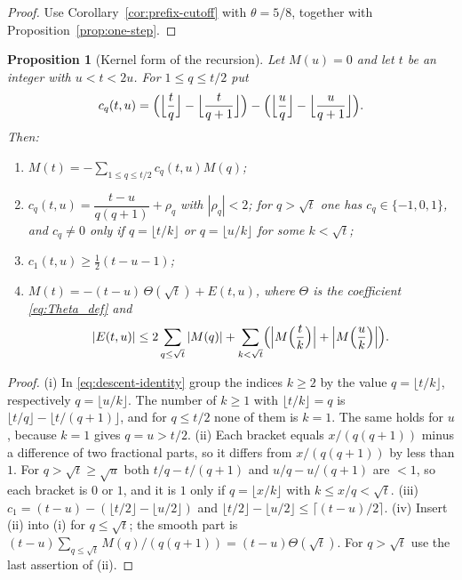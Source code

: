 \documentclass[11pt]{amsart}
\numberwithin{equation}{section}
\theoremstyle{plain}
\newtheorem{proposition}[theorem]{Proposition}
\theoremstyle{definition}
\theoremstyle{remark}
\begin{document}
\begin{proof}
Use Corollary~\ref{cor:prefix-cutoff} with $\theta=5/8$, together with
Proposition~\ref{prop:one-step}.
\end{proof}

\begin{proposition}[Kernel form of the recursion]
\label{prop:kernel}
Let $M(u)=0$ and let $t$ be an integer with $u<t<2u$. For $1\le q\le t/2$ put
\[
c_q(t,u)=\Bigl(\Bigl\lfloor\frac tq\Bigr\rfloor-\Bigl\lfloor\frac t{q+1}\Bigr\rfloor\Bigr)
-\Bigl(\Bigl\lfloor\frac uq\Bigr\rfloor-\Bigl\lfloor\frac u{q+1}\Bigr\rfloor\Bigr).
\]
Then:
\begin{enumerate}[label=\textup{(\roman*)}]
\item $M(t)=-\sum_{1\le q\le t/2}c_q(t,u)M(q)$;
\item $c_q(t,u)=\dfrac{t-u}{q(q+1)}+\rho_q$ with $|\rho_q|<2$; for $q>\sqrt t$
one has $c_q\in\{-1,0,1\}$, and $c_q\ne0$ only if $q=\lfloor t/k\rfloor$ or
$q=\lfloor u/k\rfloor$ for some $k<\sqrt t$;
\item $c_1(t,u)\ge\frac12(t-u-1)$;
\item $M(t)=-(t-u)\,\Theta(\sqrt t)+E(t,u)$, where $\Theta$ is the
coefficient \eqref{eq:Theta_def} and
\[
|E(t,u)|\le2\sum_{q\le\sqrt t}|M(q)|
+\sum_{k<\sqrt t}\Bigl(\Bigl|M\Bigl(\frac tk\Bigr)\Bigr|+\Bigl|M\Bigl(\frac uk\Bigr)\Bigr|\Bigr).
\]
\end{enumerate}
\end{proposition}

\begin{proof}
(i) In \eqref{eq:descent-identity} group the indices $k\ge2$ by the value
$q=\lfloor t/k\rfloor$, respectively $q=\lfloor u/k\rfloor$. The number of
$k\ge1$ with $\lfloor t/k\rfloor=q$ is
$\lfloor t/q\rfloor-\lfloor t/(q+1)\rfloor$, and for $q\le t/2$ none of them
is $k=1$. The same holds for $u$, because $k=1$ gives $q=u>t/2$. (ii) Each
bracket equals $x/(q(q+1))$ minus a difference of two fractional parts, so
it differs from $x/(q(q+1))$ by less than $1$. For $q>\sqrt t\ge\sqrt u$ both
$t/q-t/(q+1)$ and $u/q-u/(q+1)$ are $<1$, so each bracket is $0$ or $1$, and
it is $1$ only if $q=\lfloor x/k\rfloor$ with $k\le x/q<\sqrt t$.
(iii) $c_1=(t-u)-(\lfloor t/2\rfloor-\lfloor u/2\rfloor)$ and
$\lfloor t/2\rfloor-\lfloor u/2\rfloor\le\lceil(t-u)/2\rceil$.
(iv) Insert (ii) into (i) for $q\le\sqrt t$; the smooth part is
$(t-u)\sum_{q\le\sqrt t}M(q)/(q(q+1))=(t-u)\Theta(\sqrt t)$. For
$q>\sqrt t$ use the last assertion of (ii).
\end{proof}
\end{document}
